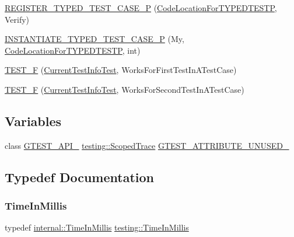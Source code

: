 \begin{DoxyCompactItemize}
\item 
\mbox{\hyperlink{namespacetesting_a9fc96ebb1c0e7db169c4a5697c903f56}{R\+E\+G\+I\+S\+T\+E\+R\+\_\+\+T\+Y\+P\+E\+D\+\_\+\+T\+E\+S\+T\+\_\+\+C\+A\+S\+E\+\_\+P}} (\mbox{\hyperlink{classtesting_1_1_code_location_for_t_y_p_e_d_t_e_s_t_p}{Code\+Location\+For\+T\+Y\+P\+E\+D\+T\+E\+S\+TP}}, Verify)
\item 
\mbox{\hyperlink{namespacetesting_a111c1dea1140652727ab97ddc13eb045}{I\+N\+S\+T\+A\+N\+T\+I\+A\+T\+E\+\_\+\+T\+Y\+P\+E\+D\+\_\+\+T\+E\+S\+T\+\_\+\+C\+A\+S\+E\+\_\+P}} (My, \mbox{\hyperlink{classtesting_1_1_code_location_for_t_y_p_e_d_t_e_s_t_p}{Code\+Location\+For\+T\+Y\+P\+E\+D\+T\+E\+S\+TP}}, int)
\item 
\mbox{\hyperlink{namespacetesting_a1e55a3ca18d877e1e83ce0ed9e7b5c79}{T\+E\+S\+T\+\_\+F}} (\mbox{\hyperlink{classtesting_1_1_current_test_info_test}{Current\+Test\+Info\+Test}}, Works\+For\+First\+Test\+In\+A\+Test\+Case)
\item 
\mbox{\hyperlink{namespacetesting_a3775bdbb5d24619425c52103e7ae6434}{T\+E\+S\+T\+\_\+F}} (\mbox{\hyperlink{classtesting_1_1_current_test_info_test}{Current\+Test\+Info\+Test}}, Works\+For\+Second\+Test\+In\+A\+Test\+Case)
\end{DoxyCompactItemize}
\subsection*{Variables}
\begin{DoxyCompactItemize}
\item 
class \mbox{\hyperlink{_obj__test_2lib_2googletest-release-1_88_81_2googletest_2include_2gtest_2internal_2gtest-port_8h_aa73be6f0ba4a7456180a94904ce17790}{G\+T\+E\+S\+T\+\_\+\+A\+P\+I\+\_\+}} \mbox{\hyperlink{classtesting_1_1_scoped_trace}{testing\+::\+Scoped\+Trace}} \mbox{\hyperlink{namespacetesting_ada49f71f486d52155b86702a570f7fcb}{G\+T\+E\+S\+T\+\_\+\+A\+T\+T\+R\+I\+B\+U\+T\+E\+\_\+\+U\+N\+U\+S\+E\+D\+\_\+}}
\end{DoxyCompactItemize}


\subsection{Typedef Documentation}
\mbox{\label{namespacetesting_a992de1d091ce660f451d1e8b3ce30fd6}} 
\subsubsection{\texorpdfstring{TimeInMillis}{TimeInMillis}}
{\footnotesize\ttfamily typedef \mbox{\hyperlink{namespacetesting_1_1internal_a5eed833eddf9ea8ca45546c125f4ef0c}{internal\+::\+Time\+In\+Millis}} \mbox{\hyperlink{namespacetesting_a992de1d091ce660f451d1e8b3ce30fd6}{testing\+::\+Time\+In\+Millis}}}

